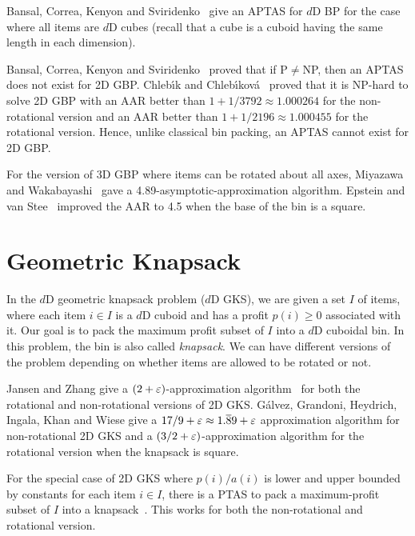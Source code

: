 Bansal, Correa, Kenyon and Sviridenko~\cite{bansal2006bin}
give an APTAS for $d$D BP for the case where all items are $d$D cubes
(recall that a cube is a cuboid having the same length in each dimension).

Bansal, Correa, Kenyon and Sviridenko~\cite{bansal2006bin}
proved that if P$\neq$NP, then an APTAS does not exist for 2D GBP.
Chleb{\'\i}k and Chleb{\'\i}kov\'a~\cite{chlebik2009hardness} proved that it is NP-hard to solve
2D GBP with an AAR better than $1+1/3792 \approx 1.000264$ for the non-rotational version
and an AAR better than $1+1/2196 \approx 1.000455$ for the rotational version.
Hence, unlike classical bin packing, an APTAS cannot exist for 2D GBP.

For the version of 3D GBP where items can be rotated about all axes,
Miyazawa and Wakabayashi~\cite{miyazawa2009three} gave a
4.89-asymptotic-approximation algorithm.
Epstein and van Stee~\cite{epstein2006side} improved the AAR to
4.5 when the base of the bin is a square.

\section{Geometric Knapsack}

In the $d$D geometric knapsack problem ($d$D GKS), we are given a set $I$ of items,
where each item $i \in I$ is a $d$D cuboid and has a profit $p(i) \ge 0$ associated with it.
Our goal is to pack the maximum profit subset of $I$ into a $d$D cuboidal bin.
In this problem, the bin is also called \emph{knapsack}.
We can have different versions of the problem depending on whether items
are allowed to be rotated or not.

Jansen and Zhang give a $(2+\varepsilon)$-approximation algorithm~\cite{jansen2004rectangle}
for both the rotational and non-rotational versions of 2D GKS.
G\'alvez, Grandoni, Heydrich, Ingala, Khan and Wiese give a
$17/9 + \varepsilon \approx 1.\overline{8}9 + \varepsilon$ approximation algorithm
for non-rotational 2D GKS and a $(3/2 + \varepsilon)$-approximation algorithm
for the rotational version when the knapsack is square.

For the special case of 2D GKS where $p(i)/a(i)$ is lower and upper bounded by constants
for each item $i \in I$, there is a PTAS to pack a maximum-profit subset of $I$
into a knapsack~\cite{bansal2009structural}. This works for both the
non-rotational and rotational version.


